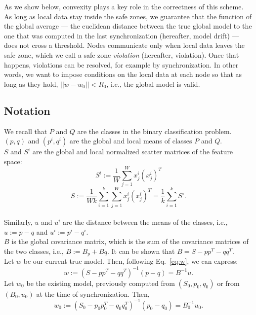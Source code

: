\par As we show below, convexity plays a key role in the correctness of this scheme. As long as local data stay inside the safe zones, we guarantee that the function of the global average ---  the euclidean distance between the true global model to the one that was computed in the last synchronization (hereafter, model drift) --- does not cross a threshold.
Nodes communicate only when local data leaves the
safe zone, which we call a safe zone \textit{violation} (hereafter,
violation). Once that happens, violations can be resolved,
for example by synchronization.
In other words, we want to impose conditions on the local
data at each node so that as long as they hold, $||w-w_0||<R_0$, i.e., the global model is valid.

\subsection{Notation}
\noindent
We recall that $P$ and $Q$ are the classes in the binary classification problem.
 $(p,q)$ and $(p^i,q^i)$  are the global and local means of classes $P$ and $Q$.
\\$S$ and $S^i$  are the global and local normalized scatter matrices of the feature space:
\begin{equation*}
S^i := \frac{1}{W}\sum_{j=1}^{W}x^i_j(x^i_j)^T
\end{equation*}
\begin{equation*}
S := \frac{1}{Wk}
\sum_{i=1}^k\sum_{j=1}^Wx^i_j(x^i_j)^T=\frac{1}{k}\sum_{i=1}^kS^i.
\end{equation*}
\\Similarly, $u$ and $u^i$ are the distance between the means of the classes, i.e., $u:=p - q$ and $u^i:=p^i - q^i$.
\\ $B$ is the global covariance matrix, which is the sum of the covariance matrices of the two classes, i.e., $B:=B_p+Bq$.
It can be shown that $B=S - pp^T - qq^T$.
\\Let $w$ be our current true model. Then, following Eq.~\ref{eq:w}, we can express:
\begin{equation}
w:=(S - pp^T - qq^T)^{-1}(p-q)=B^{-1}u.
\end{equation}
Let $w_0$ be the existing model, previously computed from $(S_0, p_0, q_0)$
or from $(B_0,u_0)$ at the time of synchronization.
Then,
\begin{equation}
w_0:=(S_0 - p_0p_0^T - q_0q_0^T)^{-1}(p_0-q_0)=B_0^{-1}u_0.
\end{equation}

